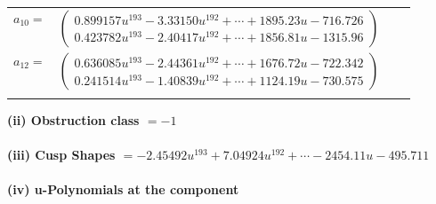 \documentclass[1p]{elsarticle_modified}
\theoremstyle{definition}
\begin{document}
\begin{tabular}{m{7pt} m{180pt} m{7pt} m{180pt} }
\flushright $a_{10}=$&$\begin{pmatrix}0.899157 u^{193}-3.33150 u^{192}+\cdots+1895.23 u-716.726\\0.423782 u^{193}-2.40417 u^{192}+\cdots+1856.81 u-1315.96\end{pmatrix}$ \\
\flushright $a_{12}=$&$\begin{pmatrix}0.636085 u^{193}-2.44361 u^{192}+\cdots+1676.72 u-722.342\\0.241514 u^{193}-1.40839 u^{192}+\cdots+1124.19 u-730.575\end{pmatrix}$\\&\end{tabular}
\flushleft \textbf{(ii) Obstruction class $= -1$}\\~\\
\flushleft \textbf{(iii) Cusp Shapes $= -2.45492 u^{193}+7.04924 u^{192}+\cdots-2454.11 u-495.711$}\\~\\
\newpage\renewcommand{\arraystretch}{1}
\flushleft \textbf{(iv) u-Polynomials at the component}\newline \\
\end{document}
